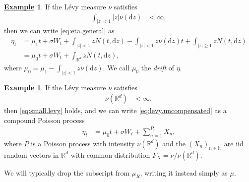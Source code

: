 \documentclass[12pt]{book}
\numberwithin{equation}{chapter}
\theoremstyle{plain}
\numberwithin{theorem}{section}
\theoremstyle{definition}
\newtheorem{example}[theorem]{\underline{Example}}
\numberwithin{exercise}{chapter}
\newcommand{\<}{\langle}
\renewcommand{\>}{\rangle}
\renewcommand{\(}{\left(}
\renewcommand{\)}{\right)}
\renewcommand{\[}{\left[}
\renewcommand{\]}{\right]}
\newcommand\Rb{\mathds{R}}
\newcommand\Nb{\mathds{N}}
\newcommand\sig{\sigma}
\newcommand\dd{\mathrm{d}}
\begin{document}
\begin{example}
If the L\'evy measure $\nu$ satisfies
\begin{align}
\int_{|z|<1} |z| \nu( \dd z)
	&< \infty , \label{eq:small.levy}
\end{align}
then we can write \eqref{eq:eta.general} as
\begin{align}
\eta_t
	&=	\mu_1 t + \sig W_t + \int_{|z| < 1} z N( t , \dd z ) - \int_{|z| < 1} z \nu( \dd z ) t + \int_{|z| \geq 1} z N( t, \dd z) \\
	&=	\mu_0 t + \sig W_t + \int_{\Rb^d} z N(t, \dd z) , \label{eq:levy.uncompensated}
\end{align}
where $\mu_0 = \mu_1 - \int_{|z| < 1} z \nu( \dd z )$.  We call $\mu_0$ the \emph{drift} of $\eta$.
\end{example}

\begin{example}
If the L\'evy measure $\nu$ satisfies
\begin{align}
\nu(\Rb^d) 
	&< \infty ,
\end{align}
then \eqref{eq:small.levy} holds, and we can write \eqref{eq:levy.uncompensated}  as a compound Poisson process
\begin{align}
\eta_t
	&=	\mu_0 t + \sig W_t + \sum_{n=1}^{P_t} X_n ,
\end{align}
where $P$ is a Poisson process with intensity $\nu(\Rb^d)$ and the $(X_n)_{n \in \Nb}$ are iid random vectors in $\Rb^d$ with common distribution $F_X = \nu / \nu(\Rb^d)$.
\end{example}
\noindent
We will typically drop the subscript from $\mu_R$, writing it instead simply as $\mu$.

\end{document}
